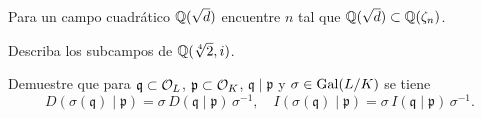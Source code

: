 \begin{ejercicio}
  Para un campo cuadrático $\mathbb{Q} (\sqrt{d})$ encuentre $n$ tal que
  $\mathbb{Q} (\sqrt{d}) \subset \mathbb{Q} (\zeta_n)$.
\end{ejercicio}

\begin{ejercicio}
  Describa los subcampos de $\mathbb{Q} (\sqrt[4]{2},i)$.
\end{ejercicio}

\begin{ejercicio}
  Demuestre que para $\mathfrak{q} \subset \mathcal{O}_L$, $\mathfrak{p} \subset \mathcal{O}_K$,
  $\mathfrak{q} \mid \mathfrak{p}$ y $\sigma \in \operatorname{Gal} (L/K)$ se tiene
  \[ D (\sigma (\mathfrak{q}) \mid \mathfrak{p}) =
  \sigma \, D (\mathfrak{q} \mid \mathfrak{p}) \, \sigma^{-1}, \quad
  I (\sigma (\mathfrak{q}) \mid \mathfrak{p}) =
  \sigma \, I (\mathfrak{q} \mid \mathfrak{p}) \, \sigma^{-1}. \]
\end{ejercicio}
